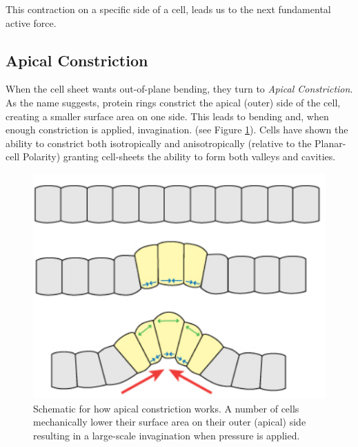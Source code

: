 This contraction on a specific side of a cell, leads us to the next fundamental active force.



\subsection{ Apical Constriction }
\label{sec:ApicalConstriction}
When the cell sheet wants out-of-plane bending, they turn to \textit{Apical Constriction}. As the name suggests, protein rings constrict the apical (outer) side of the cell, creating a smaller surface area on one side. This leads to bending and, when enough constriction is applied, invagination. (see Figure \ref{fig:apical-constriction}). Cells have shown the ability to constrict both isotropically and anisotropically (relative to the Planar-cell Polarity) granting cell-sheets the ability to form both valleys and cavities.

\begin{figure}[H]
    \centering
    \includegraphics[width=0.4\linewidth]{chapters/Theory/figures/apical_constriction_schematic.png}
    \caption{Schematic for how apical constriction works. A number of cells mechanically lower their surface area on their outer (apical) side resulting in a large-scale invagination when pressure is applied.} 
    \label{fig:apical-constriction}
\end{figure}



